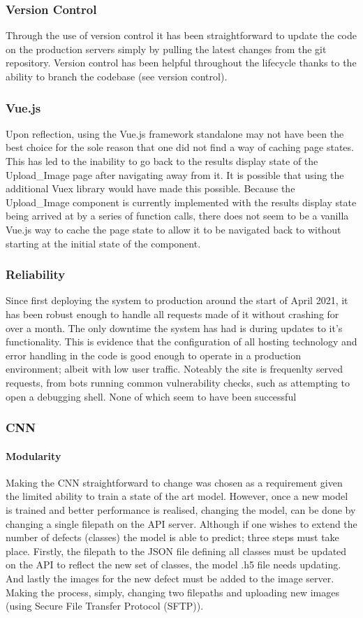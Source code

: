 \subsubsection{Version Control}
  Through the use of version control it has been straightforward to update the code on the production servers simply by pulling the latest changes from the git repository. Version control has been helpful throughout the lifecycle thanks to the ability to branch the codebase (see version control).
\subsubsection{Vue.js}
  Upon reflection, using the Vue.js framework standalone may not have been the best choice for the sole reason that one did not find a way of caching page states. This has led to the inability to go back to the results display state of the Upload\_Image page after navigating away from it. It is possible that using the additional Vuex library would have made this possible. Because the Upload\_Image component is currently implemented with the results display state being arrived at by a series of function calls, there does not seem to be a vanilla Vue.js way to cache the page state to allow it to be navigated back to without starting at the initial state of the component.
\subsubsection{Reliability}
  Since first deploying the system to production around the start of April 2021, it has been robust enough to handle all requests made of it without crashing for over a month. The only downtime the system has had is during updates to it's functionality. This is evidence that the configuration of all hosting technology and error handling in the code is good enough to operate in a production environment; albeit with low user traffic. Noteably the site is frequenlty served requests, from bots running common vulnerability checks, such as attempting to open a debugging shell. None of which seem to have been successful
\subsubsection{CNN}
  \paragraph{Modularity}
  Making the CNN straightforward to change was chosen as a requirement given the limited ability to train a state of the art model. However, once a new model is trained and better performance is realised, changing the model, can be done by changing a single filepath on the API server. Although if one wishes to extend the number of defects (classes) the model is able to predict; three steps must take place. Firstly, the filepath to the JSON file defining all classes must be updated on the API to reflect the new set of classes, the model .h5 file needs updating. And lastly the images for the new defect must be added to the image server. Making the process, simply, changing two filepaths and uploading new images (using Secure File Transfer Protocol (SFTP)).
